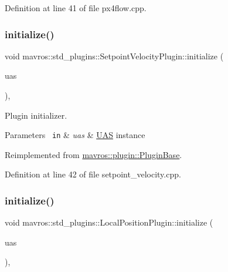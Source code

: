 Definition at line 41 of file px4flow.\+cpp.

\mbox{\label{group__plugin_ga0edbf48d95b744f3a8cb1741556541dc}} 
\subsubsection{\texorpdfstring{initialize()}{initialize()}\hspace{0.1cm}{\footnotesize\ttfamily [22/41]}}
{\footnotesize\ttfamily void mavros\+::std\+\_\+plugins\+::\+Setpoint\+Velocity\+Plugin\+::initialize (\begin{DoxyParamCaption}\item[{\mbox{\hyperlink{classmavros_1_1UAS}{U\+AS}} \&}]{uas }\end{DoxyParamCaption})\hspace{0.3cm}{\ttfamily [inline]}, {\ttfamily [virtual]}}



Plugin initializer. 


\begin{DoxyParams}[1]{Parameters}
\mbox{\texttt{ in}}  & {\em uas} & {\ttfamily \mbox{\hyperlink{classmavros_1_1UAS}{U\+AS}}} instance \\
\hline
\end{DoxyParams}


Reimplemented from \mbox{\hyperlink{group__plugin_gad5313a41da4d26acbbabf008cdc21e82}{mavros\+::plugin\+::\+Plugin\+Base}}.



Definition at line 42 of file setpoint\+\_\+velocity.\+cpp.

\mbox{\label{group__plugin_gaade9f826008c705ea3cd120c7154e26c}} 
\subsubsection{\texorpdfstring{initialize()}{initialize()}\hspace{0.1cm}{\footnotesize\ttfamily [23/41]}}
{\footnotesize\ttfamily void mavros\+::std\+\_\+plugins\+::\+Local\+Position\+Plugin\+::initialize (\begin{DoxyParamCaption}\item[{\mbox{\hyperlink{classmavros_1_1UAS}{U\+AS}} \&}]{uas }\end{DoxyParamCaption})\hspace{0.3cm}{\ttfamily [inline]}, {\ttfamily [virtual]}}



